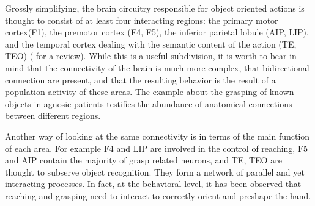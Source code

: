 

Grossly simplifying, the brain circuitry responsible 
for object oriented actions is thought to consist of at least four 
interacting regions: the primary motor cortex(F1), the premotor cortex (F4, F5), the 
inferior parietal lobule (AIP, LIP), and the temporal cortex 
dealing with the semantic content of the action 
(TE, TEO) (\cite{rizzolatti-fogassi-gallese-1997}\cite{fadiga00visuomotor} 
for a review). While this is a useful subdivision, it is worth to bear in mind 
that the connectivity of the brain is much more complex, that bidirectional 
connection are present, and that the resulting behavior is the result of a 
population activity of these areas. The example about the grasping of known 
objects in agnosic patients testifies the abundance of anatomical connections 
between different regions.

Another way of looking at the same connectivity is in terms of the main 
function of each area. For example F4 and LIP are involved in the control of 
reaching, F5 and AIP contain the majority of grasp related neurons, 
and TE, TEO are thought to subserve object recognition. They form a network 
of parallel and yet interacting processes. In fact, at the behavioral level, it has 
been observed \cite{jeannerod-arbib-rizzolatti-sakata-1995} that reaching and 
grasping need to interact to correctly orient and preshape the hand.

